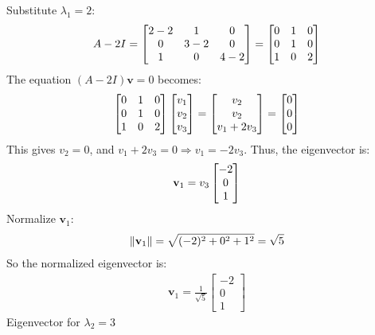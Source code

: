 Substitute $\lambda_1 = 2$:
\begin{align}
    A - 2I = \begin{bmatrix}
    2 - 2 & 1 & 0 \\
    0 & 3 - 2 & 0 \\
    1 & 0 & 4 - 2
    \end{bmatrix} = \begin{bmatrix}
    0 & 1 & 0 \\
    0 & 1 & 0 \\
    1 & 0 & 2
    \end{bmatrix}\notag
\end{align}
The equation $(A - 2I) \mathbf{v} = 0$ becomes:
\begin{align}
    \begin{bmatrix}
    0 & 1 & 0 \\
    0 & 1 & 0 \\
    1 & 0 & 2
    \end{bmatrix} \begin{bmatrix}
    v_1 \\
    v_2 \\
    v_3
    \end{bmatrix} = \begin{bmatrix}
    v_2 \\
    v_2 \\
    v_1 + 2v_3
    \end{bmatrix} = \begin{bmatrix}
    0 \\
    0 \\
    0
    \end{bmatrix}\notag
\end{align}
This gives $v_2 = 0$, and $v_1 + 2v_3 = 0 \Rightarrow v_1 = -2v_3$. Thus, the eigenvector is:
\begin{align}
    \mathbf{v}_1 = v_3 \begin{bmatrix}
    -2 \\
    0 \\
    1
    \end{bmatrix}\notag
\end{align}
Normalize $\mathbf{v}_1$:
\begin{align}
    \|\mathbf{v}_1\| = \sqrt{(-2)^2 + 0^2 + 1^2} = \sqrt{5}\notag
\end{align}
So the normalized eigenvector is:
\begin{align}
    \mathbf{v}_1 = \frac{1}{\sqrt{5}} \begin{bmatrix}
    -2 \\
    0 \\
    1
    \end{bmatrix}
\end{align}
Eigenvector for $\lambda_2 = 3$

